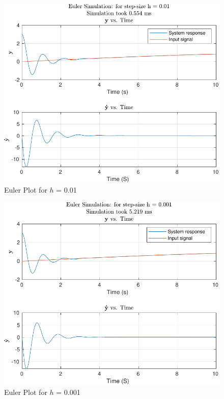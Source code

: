 \documentclass[12pt]{article}
\begin{document}
		\begin{figure}[H]
			\centering
			\includegraphics[width=1\linewidth]{"Code/Fig/Euler_plot_h_0.01.pdf"}
			\caption{Euler Plot for $h$ = 0.01}
			\label{fig:eulerploth001}
		\end{figure}
		\begin{figure}[H]
			\centering
			\includegraphics[width=1\linewidth]{"Code/Fig/Euler_plot_h_0.001.pdf"}
			\caption{Euler Plot for $h$ = 0.001}
			\label{fig:eulerploth0001}
		\end{figure}
	
\end{document}
